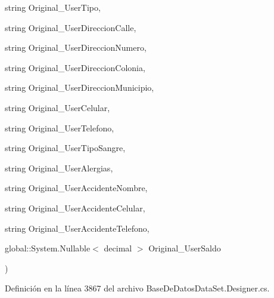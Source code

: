 {\begin{DoxyParamCaption}
\item[{string}]{Original\-\_\-\-User\-Tipo, }
\item[{string}]{Original\-\_\-\-User\-Direccion\-Calle, }
\item[{string}]{Original\-\_\-\-User\-Direccion\-Numero, }
\item[{string}]{Original\-\_\-\-User\-Direccion\-Colonia, }
\item[{string}]{Original\-\_\-\-User\-Direccion\-Municipio, }
\item[{string}]{Original\-\_\-\-User\-Celular, }
\item[{string}]{Original\-\_\-\-User\-Telefono, }
\item[{string}]{Original\-\_\-\-User\-Tipo\-Sangre, }
\item[{string}]{Original\-\_\-\-User\-Alergias, }
\item[{string}]{Original\-\_\-\-User\-Accidente\-Nombre, }
\item[{string}]{Original\-\_\-\-User\-Accidente\-Celular, }
\item[{string}]{Original\-\_\-\-User\-Accidente\-Telefono, }
\item[{global\-::\-System.\-Nullable$<$ decimal $>$}]{Original\-\_\-\-User\-Saldo}
\end{DoxyParamCaption}
)\hspace{0.3cm}{\ttfamily [virtual]}}\label{class_proyecto___integrador_1_1_base_de_datos_data_set_table_adapters_1_1_usuario_table_adapter_a574f3c61ef71c61a11f4688d06191f47}


Definición en la línea 3867 del archivo Base\-De\-Datos\-Data\-Set.\-Designer.\-cs.


